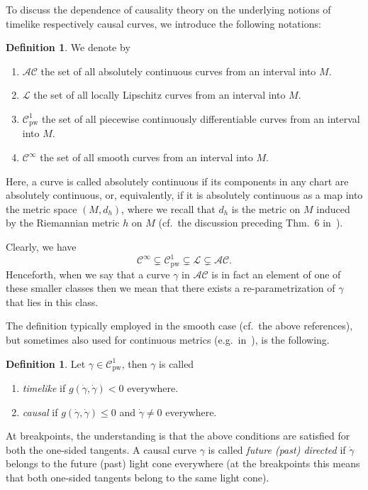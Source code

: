 \documentclass[reqno]{amsart}
\numberwithin{equation}{section}
\theoremstyle{plain}
\theoremstyle{definition}
\newtheorem{definition}[theorem]{Definition}
\theoremstyle{remark}
\newcommand{\Con}{\mathcal{C}}
\newcommand{\copw}{\mathcal{C}^1_{\mathrm{pw}}}
\begin{document}
To discuss the dependence of causality theory on the underlying notions of timelike respectively causal curves, we introduce the following notations:


\begin{definition} We denote by
 \begin{enumerate}
  \item $\mathcal{AC}$ the set of all absolutely continuous curves from an interval into $M$.
  \item $\mathcal{L}$ the set of all locally Lipschitz curves from an interval into $M$.
  \item $\copw$ the set of all piecewise continuously differentiable curves from an interval into $M$.
  \item $\Con^\infty$ the set of all smooth curves from an interval into $M$.
 \end{enumerate}
\end{definition}


Here, a curve is called absolutely continuous if its components in any chart are 
absolutely continuous, or, equivalently, if it is absolutely continuous as
a map into the metric space $(M,d_h)$, where we recall that $d_h$ is the metric on $M$
induced by the Riemannian metric $h$ on $M$ (cf.\ the discussion preceding Thm.\ 6 in~\cite{Min:15}).

Clearly, we have
\begin{equation}\label{eq-cla-cha}
\Con^\infty \subsetneq \copw \subsetneq \mathcal{L} \subsetneq \mathcal{AC}.
\end{equation}
Henceforth, when we say that a curve $\gamma$ in $\mathcal{AC}$ is in fact an element of one of these smaller classes then we mean that there exists a re-parametrization of $\gamma$ that lies in this class. 
 

The definition typically employed in the smooth case (cf.\ the above references),  
but sometimes also used for continuous metrics (e.g.\ in~\cite{Sbi:18}), 
is the following.
\begin{definition}\label{def-cc-cpw}
 Let $\gamma\in\copw$, then $\gamma$ is 
called
\begin{enumerate}
 \item[] \emph{timelike} if $g(\dot\gamma,\dot\gamma)<0$ everywhere.
 \item[] \emph{causal} if $g(\dot\gamma,\dot\gamma)\leq 0$ and $\dot\gamma\neq0$ everywhere.
\end{enumerate}
At breakpoints, the understanding is that the above conditions are satisfied for both the one-sided tangents. A causal curve $\gamma$ is called \emph{future (past) directed} if 
$\dot\gamma$ belongs to the future (past) light cone everywhere (at the breakpoints this means that both one-sided tangents 
belong to the same light cone).
\end{definition}
\end{document}
